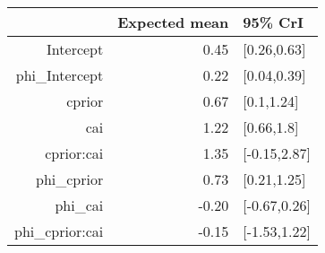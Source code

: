 \begin{tabular}{rrl}
  \hline
 & Expected mean & 95\% CrI \\ 
  \hline
Intercept & 0.45 & [0.26,0.63] \\ 
  phi\_Intercept & 0.22 & [0.04,0.39] \\ 
  cprior & 0.67 & [0.1,1.24] \\ 
  cai & 1.22 & [0.66,1.8] \\ 
  cprior:cai & 1.35 & [-0.15,2.87] \\ 
  phi\_cprior & 0.73 & [0.21,1.25] \\ 
  phi\_cai & -0.20 & [-0.67,0.26] \\ 
  phi\_cprior:cai & -0.15 & [-1.53,1.22] \\ 
   \hline
\end{tabular}

